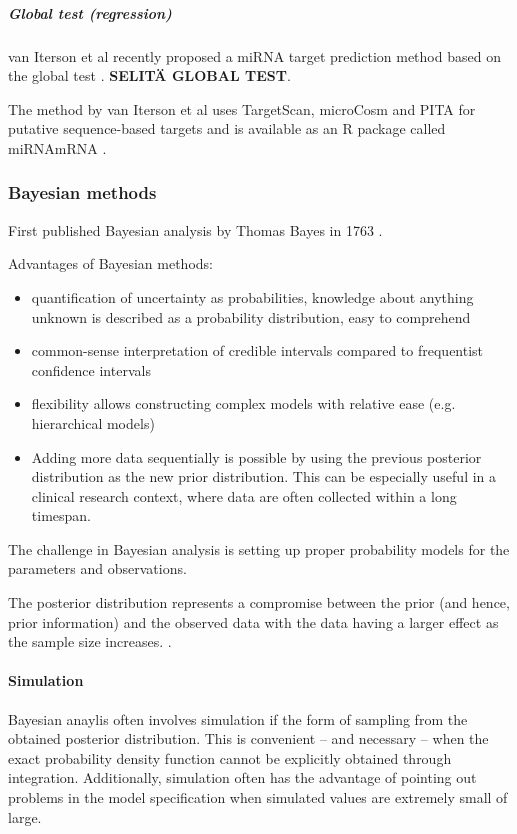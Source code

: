 \subparagraph{Global test (regression)}\label{global-test-regression}

van Iterson et al recently proposed a miRNA target prediction method based on
the global test \citep{vanIterson2013}. \textbf{SELITÄ GLOBAL TEST}.

The method by van Iterson et al uses TargetScan, microCosm and PITA for
putative sequence-based targets and is available as an R package called
miRNAmRNA \citep{vanItersonWeb}.





\subsubsection{Bayesian methods}\label{bayesian-methods}

First published Bayesian analysis by Thomas Bayes in 1763 \citep{Gelman2013}.

Advantages of Bayesian methods:
\begin{itemize}
  \item
  quantification of uncertainty as probabilities, knowledge about anything
  unknown is described as a probability distribution, easy to comprehend
  \item
  common-sense interpretation of credible intervals compared to frequentist
  confidence intervals
  \item
  flexibility allows constructing complex models with relative ease (e.g.
  hierarchical models)
  \item
  Adding more data sequentially is possible by using the previous posterior
  distribution as the new prior distribution. This can be especially useful in
  a clinical research context, where data are often collected within a long
  timespan.
\end{itemize}
The challenge in Bayesian analysis is setting up proper probability models for
the parameters and observations. \citep{Gelman2013}

The posterior distribution represents a compromise between the prior (and
hence, prior information) and the observed data with the data having a larger
effect as the sample size increases. \citep{Gelman2013}.


\paragraph{Simulation}\label{simulation}

Bayesian anaylis often involves simulation if the form of sampling from the
obtained posterior distribution. This is convenient -- and necessary -- when
the exact probability density function cannot be explicitly obtained through
integration. Additionally, simulation often has the advantage of pointing out
problems in the model specification when simulated values are extremely small
of large.

